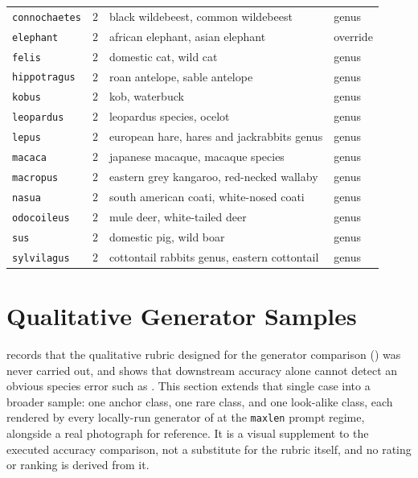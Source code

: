 \begin{table}[htbp]
\begin{tabularx}{\textwidth}{@{}llXl@{}}
    \texttt{connochaetes} & $2$ & black wildebeest, common wildebeest & genus \\
    \texttt{elephant} & $2$ & african elephant, asian elephant & override \\
    \texttt{felis} & $2$ & domestic cat, wild cat & genus \\
    \texttt{hippotragus} & $2$ & roan antelope, sable antelope & genus \\
    \texttt{kobus} & $2$ & kob, waterbuck & genus \\
    \texttt{leopardus} & $2$ & leopardus species, ocelot & genus \\
    \texttt{lepus} & $2$ & european hare, hares and jackrabbits genus & genus \\
    \texttt{macaca} & $2$ & japanese macaque, macaque species & genus \\
    \texttt{macropus} & $2$ & eastern grey kangaroo, red-necked wallaby & genus \\
    \texttt{nasua} & $2$ & south american coati, white-nosed coati & genus \\
    \texttt{odocoileus} & $2$ & mule deer, white-tailed deer & genus \\
    \texttt{sus} & $2$ & domestic pig, wild boar & genus \\
    \texttt{sylvilagus} & $2$ & cottontail rabbits genus, eastern cottontail & genus \\
    \bottomrule
\end{tabularx}
\end{table}

\section{Qualitative Generator Samples}\label{sec:appendix_generator_gallery}

 records that the qualitative rubric designed for the generator comparison () was never carried out, and  shows that downstream accuracy alone cannot detect an obvious species error such as . This section extends that single case into a broader sample: one anchor class, one rare class, and one look-alike class, each rendered by every locally-run generator of  at the \texttt{maxlen} prompt regime, alongside a real photograph for reference. It is a visual supplement to the executed accuracy comparison, not a substitute for the rubric itself, and no rating or ranking is derived from it.

